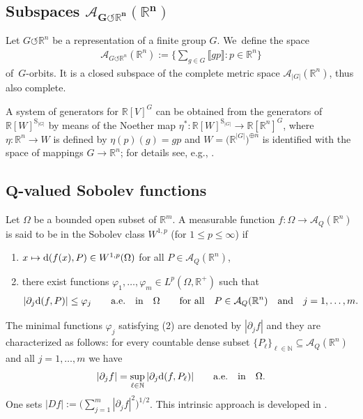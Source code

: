 \documentclass[pdftex]{sigma}
\numberwithin{equation}{section}
\def\et{\eta}
\def\vh{\varphi}
\def\Om{\Omega}
\def\N{\mathbb{N}}
\def\R{\mathbb{R}}
\def\cA{\mathcal{A}}
\def\p{\partial}
\def\acts{\circlearrowleft}
\let\on=\operatorname
\begin{document}
\subsection{Subspaces $\boldsymbol{\cA_{G\acts \R^n}(\R^n)}$}

Let $G\acts \R^n$ be a representation of a finite group $G$. We~define the space
\begin{gather*}
 \cA_{G\acts \R^n}(\R^n) :=
 \bigg\{ \sum_{g \in G} \llbracket g p \rrbracket \colon p \in \R^n\bigg\}
\end{gather*}
of~$G$-orbits. It is a closed subspace of the complete metric space $\cA_{|G|}(\R^n)$, thus also complete.

A system of generators for $\R[V]^G$ can be obtained from the generators of $\R[W]^{\on{S}_{|G|}}$
by means of the Noether map $\eta^* \colon \R[W]^{\on{S}_{|G|}} \to \R[\R^n]^G$, where $\eta \colon \R^n \to W$
is defined by $\et(p)(g) = gp$ and $W= \big(\R^{|G|}\big)^{\oplus n}$ is identified with the space of mappings $G \to \R^n$;
for details see, e.g., \cite{Neusel:2002aa}.

\subsection{$\boldsymbol Q$-valued Sobolev functions}

Let $\Om$ be a bounded open subset of $\R^m$.
A measurable function $f \colon \Om \to \cA_Q(\R^n)$ is said to be in the Sobolev class $W^{1,p}$ (for $1 \le p \le \infty$)
if
\begin{enumerate}
 \item[1)] $x \mapsto {\rm d}(f(x),P) \in W^{1,p}(\Om)$ for all $P \in \cA_Q(\R^n)$,
 \item[2)] there exist functions $\vh_1,\dots,\vh_m \in L^p(\Om,\R^+)$ such that
 \begin{gather*}
 |\p_j {\rm d}(f,P)| \le \vh_j \qquad \text{a.e.\quad in}\quad \Om \qquad
 \text{for all}\quad P \in \cA_Q(\R^n)\quad \text{and}\quad j = 1,\dots,m.
 \end{gather*}
\end{enumerate}
The minimal functions $\vh_j$ satisfying (2) are denoted by $|\p_j f|$ and they are characterized as follows:
for every countable dense subset $\{P_\ell\}_{\ell \in \N} \subseteq \cA_Q(\R^n)$ and all $j = 1,\dots,m$
we have
\begin{gather*}
 |\p_j f| = \sup_{\ell \in \N} |\p_j {\rm d}(f,P_\ell)| \qquad \text{a.e.\quad in}\quad \Om.
\end{gather*}
One sets $|Df| := \big(\sum_{j= 1}^m |\p_j f|^2\big)^{1/2}$. This intrinsic approach is developed in \cite{De-LellisSpadaro11}.
\end{document}
